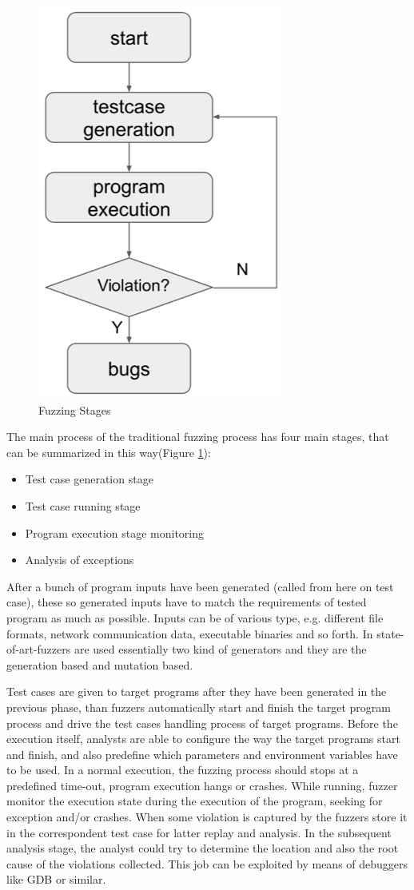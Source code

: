 \begin{figure}[tbh]
  \centering
  \includegraphics[width=0.5\linewidth]{images/intro/fuzz_stages.png}
  \caption[Fuzzing Stages]{Fuzzing Stages}
  \label{fig:fuzz_stages}
\end{figure}


The main process of the traditional fuzzing process has four main stages, that can be summarized in this way(Figure \ref{fig:fuzz_stages}):
\begin{itemize}
  \item Test case generation stage
  \item Test case running stage
  \item Program execution stage monitoring
  \item Analysis of exceptions
  \end{itemize}


After a bunch of program inputs have been generated (called from here on test case), these so generated inputs have to match the requirements of tested program as much as possible. 
Inputs can be of various type, e.g. different file formats, network communication data, executable binaries and so forth.
In state-of-art-fuzzers are used essentially two kind of generators and they are the generation based and mutation based.

Test cases are given to target programs after they have been generated in the previous phase, than fuzzers automatically start and finish the target program process and drive the test cases handling process of target programs. 
Before the execution itself, analysts are able to configure the way the target programs start and finish, and also predefine which parameters and environment variables have to be used. 
In a normal execution, the fuzzing process should stops at a predefined time-out, program execution hangs or crashes. While running, fuzzer monitor the execution state during the execution of the program, seeking for exception and/or crashes.
When some violation is captured by the fuzzers store it in the correspondent test case for latter replay and analysis.
In the subsequent analysis stage, the analyst could try to determine the location and also the root cause of the violations collected. This job can be exploited by means of debuggers like GDB or similar.

